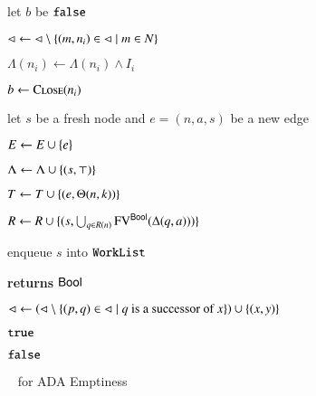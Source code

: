 \documentclass[10pt,conference,letterpaper,twocolumn]{IEEEtran}
\begin{document}
\begin{algorithm}[t!]
{\begin{algorithmic}[1]
  \State let $b$ be $\mathtt{false}$



  \State $\lhd \leftarrow \lhd \setminus \left\{ (m,n_i) \in \lhd \mid m \in N \right\}$

  \State $\Lambda(n_i) \leftarrow \Lambda(n_i) \wedge I_i$


  \State $b \leftarrow \Call{Close}{n_i}$
  \label{ln:refine-end}

  \EndIf

  \EndIf

  \EndFor

  \EndIf

  \EndIf

  \label{ln:expand-begin}

  \State let $s$ be a fresh node and $e = (n,a,s)$ be a new edge

  \State $E \leftarrow E \cup \left\{ e \right\}$

  \State $\Lambda \leftarrow \Lambda \cup \left\{ (s,\top) \right\}$

  \State $T \leftarrow T \cup \left\{ (e, \Theta(n,k)) \right\}$

  \State $R \leftarrow R \cup \{(s,\bigcup_{q \in R(n)}\mathrm{FV}^{\mathsf{Bool}}(\Delta(q,a)))\}$

  \State enqueue $s$ into $\mathtt{WorkList}$
  \label{ln:expand-end}

  \EndFor

  \EndIf

  \EndWhile  
\end{algorithmic}

\begin{algorithmic}[1]
 {\bf returns} $\mathsf{Bool}$



\State $\lhd \leftarrow \left(\lhd \setminus \left\{  (p,q) \in \lhd \mid
  \text{$q$ is a successor of $x$} \right\}\right) \cup \left\{ (x,y) \right\}$
\label{ln:close-uncover}

 $\mathtt{true}$ 

\EndIf

\EndFor

 $\mathtt{false}$

\EndFunction
\end{algorithmic}}
\caption{\impact~ for ADA Emptiness}
\label{alg:impact}
\end{algorithm}
\end{document}
